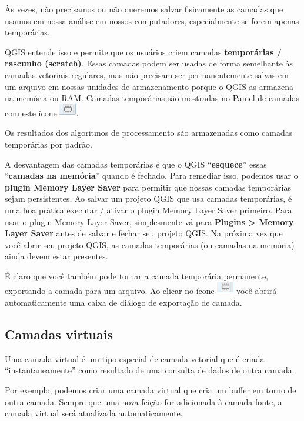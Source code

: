 \documentclass[
]{krantz}
\begin{document}
Às vezes, não precisamos ou não queremos salvar fisicamente as camadas que usamos em nossa análise em nossos computadores, especialmente se forem apenas temporárias.

QGIS entende isso e permite que os usuários criem camadas \textbf{temporárias / rascunho (scratch)}. Essas camadas podem ser usadas de forma semelhante às camadas vetoriais regulares, mas não precisam ser permanentemente salvas em um arquivo em nossas unidades de armazenamento porque o QGIS as armazena na memória ou RAM. Camadas temporárias são mostradas no Painel de camadas com este ícone \includegraphics{media/modulo2/symbol-temp.png}.

Os resultados dos algoritmos de processamento são armazenadas como camadas temporárias por padrão.

A desvantagem das camadas temporárias é que o QGIS ``\textbf{esquece}'' essas ``\textbf{camadas na memória}'' quando é fechado. Para remediar isso, podemos usar o \textbf{plugin Memory Layer Saver} para permitir que nossas camadas temporárias sejam persistentes. Ao salvar um projeto QGIS que usa camadas temporárias, é uma boa prática executar / ativar o plugin Memory Layer Saver primeiro. Para usar o plugin Memory Layer Saver, simplesmente vá para \textbf{Plugins \textgreater{} Memory Layer Saver} antes de salvar e fechar seu projeto QGIS. Na próxima vez que você abrir seu projeto QGIS, as camadas temporárias (ou camadas na memória) ainda devem estar presentes.

É claro que você também pode tornar a camada temporária permanente, exportando a camada para um arquivo. Ao clicar no ícone \includegraphics{media/modulo2/symbol-temp.png} você abrirá automaticamente uma caixa de diálogo de exportação de camada.

\hypertarget{camadas-virtuais}{%
\subsection{Camadas virtuais}\label{camadas-virtuais}}

Uma camada virtual é um tipo especial de camada vetorial que é criada ``instantaneamente'' como resultado de uma consulta de dados de outra camada.

Por exemplo, podemos criar uma camada virtual que cria um buffer em torno de outra camada. Sempre que uma nova feição for adicionada à camada fonte, a camada virtual será atualizada automaticamente.
\end{document}
